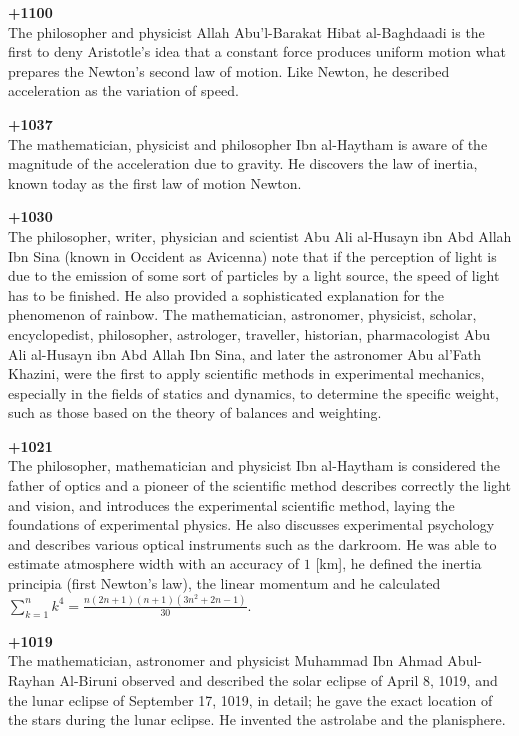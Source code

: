 \textbf{+1100}\\
The philosopher and physicist Allah Abu'l-Barakat Hibat al-Baghdaadi is the first to deny Aristotle's idea that a constant force produces uniform motion what prepares the Newton's second law of motion. Like Newton, he described acceleration as the variation of speed.

\textbf{+1037}\\
The mathematician, physicist and philosopher Ibn al-Haytham is aware of the magnitude of the acceleration due to gravity. He discovers the law of inertia, known today as the first law of motion Newton.

\textbf{+1030}\\
The philosopher, writer, physician and scientist Abu Ali al-Husayn ibn Abd Allah Ibn Sina (known in Occident as Avicenna) note that if the perception of light is due to the emission of some sort of particles by a light source, the speed of light has to be finished. He also provided a sophisticated explanation for the phenomenon of rainbow. The mathematician, astronomer, physicist, scholar, encyclopedist, philosopher, astrologer, traveller, historian, pharmacologist Abu Ali al-Husayn ibn Abd Allah Ibn Sina, and later the astronomer Abu al'Fath Khazini, were the first to apply scientific methods in experimental mechanics, especially in the fields of statics and dynamics, to determine the specific weight, such as those based on the theory of balances and weighting.

\textbf{+1021}\\
The philosopher, mathematician and physicist Ibn al-Haytham is considered the father of optics and a pioneer of the scientific method describes correctly the light and vision, and introduces the experimental scientific method, laying the foundations of experimental physics. He also discusses experimental psychology and describes various optical instruments such as the darkroom. He was able to estimate atmosphere width with an accuracy of $1$ [km], he defined the inertia principia (first Newton's law), the linear momentum and he calculated $\sum_{k=1}^n k^4=\frac{n(2n+1)(n+1)(3n^2+2n-1)}{30}$.

\textbf{+1019}\\
The mathematician, astronomer and physicist Muhammad Ibn Ahmad Abul-Rayhan Al-Biruni observed and described the solar eclipse of April 8, 1019, and the lunar eclipse of September 17, 1019, in detail; he gave the exact location of the stars during the lunar eclipse. He invented the astrolabe and the planisphere.

